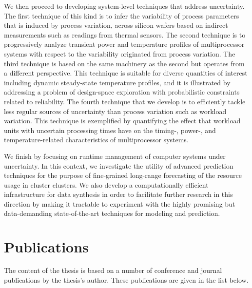 We then proceed to developing system-level techniques that address uncertainty.
The first technique of this kind is to infer the variability of process
parameters that is induced by process variation, across silicon wafers based on
indirect measurements such as readings from thermal sensors. The second
technique is to progressively analyze transient power and temperature profiles
of multiprocessor systems with respect to the variability originated from
process variation. The third technique is based on the same machinery as the
second but operates from a different perspective. This technique is suitable for
diverse quantities of interest including dynamic steady-state temperature
profiles, and it is illustrated by addressing a problem of design-space
exploration with probabilistic constraints related to reliability. The fourth
technique that we develop is to efficiently tackle less regular sources of
uncertainty than process variation such as workload variation. This technique is
exemplified by quantifying the effect that workload units with uncertain
processing times have on the timing-, power-, and temperature-related
characteristics of multiprocessor systems.

We finish by focusing on runtime management of computer systems under
uncertainty. In this context, we investigate the utility of advanced prediction
techniques for the purpose of fine-grained long-range forecasting of the
resource usage in cluster clusters. We also develop a computationally efficient
infrastructure for data synthesis in order to facilitate further research in
this direction by making it tractable to experiment with the highly promising
but data-demanding state-of-the-art techniques for modeling and prediction.

\section{Publications}

The content of the thesis is based on a number of conference and journal
publications by the thesis's author. These publications are given in the list
below.

\printbibliography[heading=none,keyword=own]
